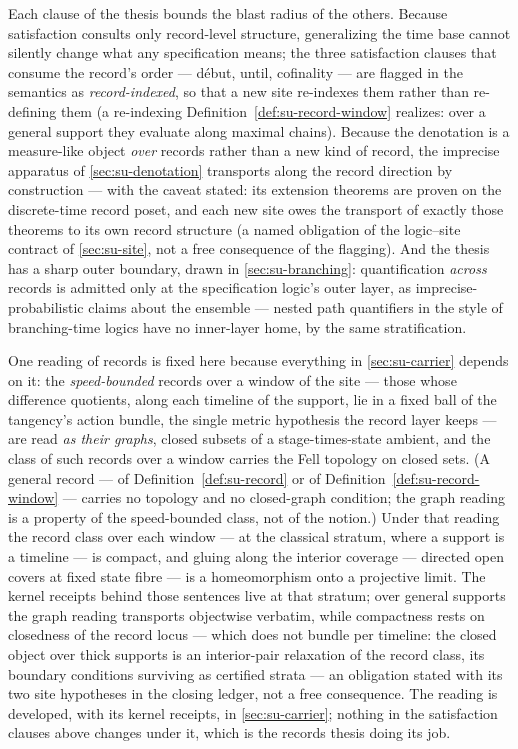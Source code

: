 Each clause of the thesis bounds the blast radius of the others.
Because satisfaction consults only record-level structure,
generalizing the time base cannot silently change what any
specification means; the three satisfaction clauses that consume the
record's order --- d\'ebut, until, cofinality --- are flagged in the
semantics as \emph{record-indexed}, so that a new site re-indexes
them rather than re-defining them (a re-indexing
Definition~\ref{def:su-record-window} realizes: over a general
support they evaluate along maximal chains). Because the denotation is a
measure-like object \emph{over} records rather than a new kind of
record, the imprecise apparatus of \autoref{sec:su-denotation}
transports along the record direction by construction --- with the
caveat stated: its extension theorems are proven on the
discrete-time record poset, and each new site owes the transport of
exactly those theorems to its own record structure (a named
obligation of the logic--site contract of
\autoref{sec:su-site}, not a
free consequence of the
flagging). And the thesis has a sharp outer boundary, drawn in
\autoref{sec:su-branching}: quantification \emph{across} records is
admitted only at the specification logic's outer layer, as
imprecise-probabilistic claims about the ensemble --- nested path
quantifiers in the style of branching-time logics have no inner-layer
home, by the same stratification.

One reading of records is fixed here because everything in
\autoref{sec:su-carrier} depends on it: the
\emph{speed-bounded} records over a window of the site --- those
whose difference quotients, along each timeline of the support, lie
in a fixed ball of the tangency's
action bundle, the single metric hypothesis the record layer keeps
--- are read \emph{as their graphs}, closed subsets of a
stage-times-state ambient, and the class of such records over a
window carries the Fell topology on closed sets. (A general record
--- of Definition~\ref{def:su-record} or of
Definition~\ref{def:su-record-window} --- carries no topology and no
closed-graph condition; the graph reading is a property of the
speed-bounded class, not of the notion.) Under that reading the
record class over each window --- at the classical stratum, where a
support is a timeline --- is compact, and gluing along the
interior coverage --- directed open covers at fixed state fibre ---
is a homeomorphism onto a projective limit. The kernel receipts
behind those sentences live at that stratum; over general supports
the graph reading transports
objectwise verbatim, while compactness rests on closedness of the
record locus --- which does not bundle per timeline: the closed
object over thick supports is an interior-pair relaxation of the
record class, its boundary conditions surviving as certified strata
--- an obligation stated with its two site
hypotheses in the closing ledger, not a free consequence. The reading is developed, with its kernel
receipts, in \autoref{sec:su-carrier}; nothing in the satisfaction
clauses above changes under it, which is the records thesis doing its
job.

